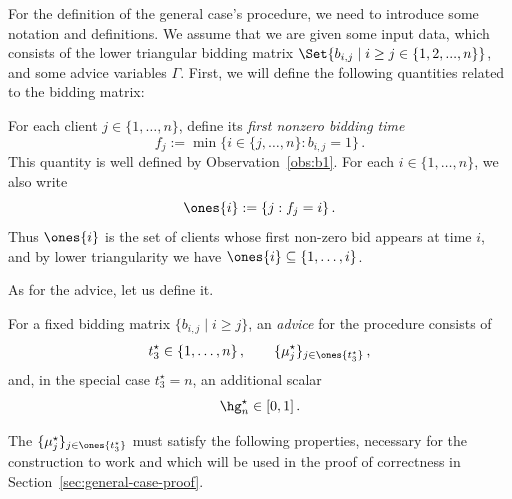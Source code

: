 
For the definition of the general case's procedure, we need to introduce some notation and definitions. We assume that we are given some input data, which consists of the lower triangular bidding matrix $\Set{b_{i,j} \mid i \geq j \in \{1, 2, ..., n\}}$, and some advice variables $\Gamma$. First, we will define the following quantities related to the bidding matrix:

\begin{definition}
    For each client $j\in\{1,\dots,n\}$, define its \emph{first nonzero bidding time}
    \begin{equation*}
        f_j := \min\{i\in\{j,\dots,n\} : b_{i,j}=1\}\,.
    \end{equation*}
    This quantity is well defined by Observation~\ref{obs:b1}. For each $i\in\{1,\dots,n\}$, we also write
    \begin{equation*}
        \ones{i} := \{j : f_j=i\}\,.
    \end{equation*}
    Thus $\ones{i}$ is the set of clients whose first non-zero bid appears at time $i$, and by lower triangularity we have $\ones{i}\subseteq\{1,\dots,i\}$.
\end{definition}

As for the advice, let us define it.

\begin{definition}\label{def:auxiliary-input}
    For a fixed bidding matrix $\{b_{i,j}\mid i\ge j\}$, an \emph{advice} for the procedure consists of
    \begin{equation*}
        t_3^\star \in \{1,\dots,n\}\,, \qquad
        \{\mu_j^\star\}_{j\in\ones{t_3^\star}}\,,
    \end{equation*}
    and, in the special case $t_3^\star=n$, an additional scalar
    \begin{equation*}
        \hg_n^\star \in [0,1]\,.
    \end{equation*}
\end{definition}


The $\{\mu_j^\star\}_{j\in\ones{t_3^\star}}$ must satisfy the following properties, necessary for the construction to work and which will be used in the proof of correctness in Section~\ref{sec:general-case-proof}.

